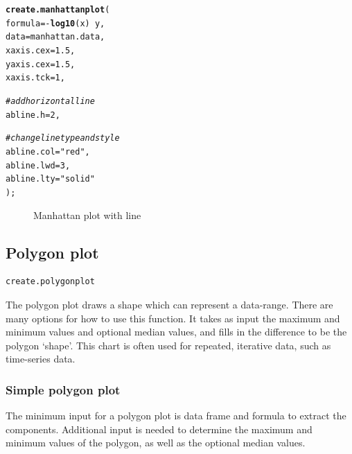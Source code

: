 \documentclass[letterpaper]{report}\usepackage[]{graphicx}\usepackage[]{color}
\makeatletter
\newcommand{\hlnum}[1]{\textcolor[rgb]{0.686,0.059,0.569}{#1}}%
\newcommand{\hlstr}[1]{\textcolor[rgb]{0.192,0.494,0.8}{#1}}%
\newcommand{\hlcom}[1]{\textcolor[rgb]{0.678,0.584,0.686}{\textit{#1}}}%
\newcommand{\hlopt}[1]{\textcolor[rgb]{0,0,0}{#1}}%
\newcommand{\hlstd}[1]{\textcolor[rgb]{0.345,0.345,0.345}{#1}}%
\newcommand{\hlkwc}[1]{\textcolor[rgb]{0.333,0.667,0.333}{#1}}%
\newcommand{\hlkwd}[1]{\textcolor[rgb]{0.737,0.353,0.396}{\textbf{#1}}}%
\newenvironment{kframe}{%
 \def\at@end@of@kframe{}%
 \ifinner\ifhmode%
  \def\at@end@of@kframe{\end{minipage}}%
  \begin{minipage}{\columnwidth}%
 \fi\fi%
 \def\FrameCommand##1{\hskip\@totalleftmargin \hskip-\fboxsep
 \colorbox{shadecolor}{##1}\hskip-\fboxsep
     \hskip-\linewidth \hskip-\@totalleftmargin \hskip\columnwidth}%
 \MakeFramed {\advance\hsize-\width
   \@totalleftmargin\z@ \linewidth\hsize
   \@setminipage}}%
 {\par\unskip\endMakeFramed%
 \at@end@of@kframe}
\newenvironment{knitrout}{}{} %
\makeatother
\begin{document}
\begin{knitrout}
\color{fgcolor}\begin{kframe}
\begin{alltt}
\hlkwd{create.manhattanplot}\hlstd{(}
    \hlkwc{formula} \hlstd{=} \hlopt{-}\hlkwd{log10}\hlstd{(x)} \hlopt{~} \hlstd{y,}
    \hlkwc{data} \hlstd{= manhattan.data,}
    \hlkwc{xaxis.cex} \hlstd{=} \hlnum{1.5}\hlstd{,}
    \hlkwc{yaxis.cex} \hlstd{=} \hlnum{1.5}     \hlstd{,}
    \hlkwc{xaxis.tck} \hlstd{=} \hlnum{1}\hlstd{,}

    \hlcom{# add horizontal line}
    \hlkwc{abline.h} \hlstd{=} \hlnum{2}\hlstd{,}

    \hlcom{# change line type and style}
    \hlkwc{abline.col} \hlstd{=} \hlstr{"red"}\hlstd{,}
    \hlkwc{abline.lwd} \hlstd{=} \hlnum{3}\hlstd{,}
    \hlkwc{abline.lty} \hlstd{=} \hlstr{"solid"}
    \hlstd{);}
\end{alltt}
\end{kframe}\begin{figure}

{\centering {} 

}

\caption[Manhattan plot with line]{Manhattan plot with line}\label{fig:manhattan2}
\end{figure}


\end{knitrout}

\subsection{Polygon plot}
\begin{verbatim}
create.polygonplot
\end{verbatim}

The polygon plot draws a shape which can represent a data-range. There are many options for how to use this function. It takes as input the maximum and minimum values and optional median values, and fills in the difference to be the polygon `shape'. This chart is often used for repeated, iterative data, such as time-series data.

\subsubsection{Simple polygon plot}
The minimum input for a polygon plot is data frame and formula to extract the components. Additional input is needed to determine the maximum and minimum values of the polygon, as well as the optional median values.
\end{document}
